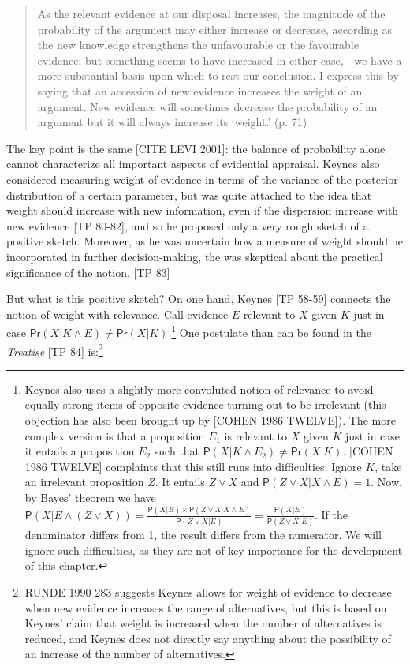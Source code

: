 \documentclass[
  10pt,
  dvipsnames,enabledeprecatedfontcommands]{scrartcl}
\newcommand{\pr}[1]{\mathsf{P}(#1)}
\begin{document}
\begin{quote}
As the relevant evidence at our disposal increases, the magnitude of the
probability of the argument may either increase or decrease, according as the new knowledge strengthens the unfavourable or the favourable evidence; but something seems to have increased in either case,—we have a more substantial basis upon which to rest our conclusion. I express this by saying that an accession of new evidence increases the weight of an argument. New evidence will sometimes decrease the probability of an argument but it will always increase its `weight.' (p. 71)
\end{quote}

\noindent The key point is the same {[}CITE LEVI 2001{]}: the balance of
probability alone cannot characterize all important aspects of
evidential appraisal. Keynes also considered measuring weight of
evidence in terms of the variance of the posterior distribution of a
certain parameter, but was quite attached to the idea that weight should
increase with new information, even if the dispersion increase with new
evidence {[}TP 80-82{]}, and so he proposed only a very rough sketch of
a positive sketch. Moreover, as he was uncertain how a measure of weight
should be incorporated in further decision-making, the was skeptical
about the practical significance of the notion. {[}TP 83{]}

But what is this positive sketch? On one hand, Keynes {[}TP 58-59{]}
connects the notion of weight with relevance. Call evidence \(E\)
relevant to \(X\) given \(K\) just in case
\(\mathsf{Pr}(X\vert K \wedge E) \neq \mathsf{Pr}(X \vert K)\).\footnote{
  Keynes also uses a slightly more convoluted notion of relevance to
  avoid equally strong items of opposite evidence turning out to be
  irrelevant (this objection has also been brought up by {[}COHEN 1986
  TWELVE{]}). The more complex version is that a proposition \(E_1\) is
  relevant to \(X\) given \(K\) just in case it entails a proposition
  \(E_2\) such that
  \(\pr{X\vert K \wedge E_2} \neq \mathsf{Pr}(X \vert K)\). {[}COHEN
  1986 TWELVE{]} complaints that this still runs into difficulties.
  Ignore \(K\), take an irrelevant proposition \(Z\). It entails
  \(Z\vee X\) and \(\pr{Z \vee X\vert X \wedge E}=1\). Now, by Bayes'
  theorem we have
  \(\pr{X \vert E \wedge (Z \vee X)} = \frac{\pr{X \vert E}\times \pr{Z \vee X \vert X \wedge E}}{\pr{Z \vee X \vert E}} = \frac{\pr{X \vert E}}{\pr{Z \vee X \vert E}}\).
  If the denominator differs from 1, the result differs from the
  numerator. We will ignore such difficulties, as they are not of key
  importance for the development of this chapter.} One postulate than
can be found in the \emph{Treatise} {[}TP 84{]} is:\footnote{RUNDE 1990
  283 suggests Keynes allows for weight of evidence to decrease when new
  evidence increases the range of alternatives, but this is based on
  Keynes' claim that weight is increased when the number of alternatives
  is reduced, and Keynes does not directly say anything about the
  possibility of an increase of the number of alternatives.}
\end{document}
